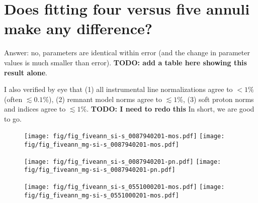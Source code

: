 \documentclass[twocolumn,tighten,trackchanges]{aastex61}
\begin{document}
\clearpage
\section{Does fitting four versus five annuli make any difference?}

Answer: no, parameters are identical within error (and the change in parameter
values is much smaller than error).
\textbf{TODO: add a table here showing this result alone}.

I also verified by eye that
(1) all instrumental line normalizations agree to $<1\%$ (often $\lesssim0.1\%$),
(2) remnant model norms agree to $\lesssim 1$\%,
(3) soft proton norms and indices agree to $\lesssim 1\%$.
\textbf{TODO: I need to redo this}
In short, we are good to go.

\begin{figure}[!hb]
  \texttt{[image: fig/fig\_fiveann\_si-s\_0087940201-mos.pdf]}
  \texttt{[image: fig/fig\_fiveann\_mg-si-s\_0087940201-mos.pdf]} \\
\end{figure}

\begin{figure}[!hb]
  \texttt{[image: fig/fig\_fiveann\_si-s\_0087940201-pn.pdf]}
  \texttt{[image: fig/fig\_fiveann\_mg-si-s\_0087940201-pn.pdf]}
\end{figure}

\begin{figure}[!hb]
  \texttt{[image: fig/fig\_fiveann\_si-s\_0551000201-mos.pdf]}
  \texttt{[image: fig/fig\_fiveann\_mg-si-s\_0551000201-mos.pdf]}
\end{figure}

\clearpage
\end{document}
